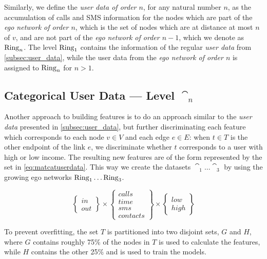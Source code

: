 Similarly, we define the \emph{user data of order $n$}, for any natural number $n$, as the accumulation of calls and SMS information for the nodes which are part of the \emph{ego network of order $n$}, which is the set of nodes which are at distance at most $n$ of $v$, and are not part of the \emph{ego network of order $n - 1$}, which we denote as $\operatorname{Ring}_n$.
The level $\operatorname{Ring}_1$ contains the information of the regular \emph{user data} from \cref{subsec:user_data}, while the user data from the \emph{ego network of order $n$} is assigned to $\operatorname{Ring}_n$ for $n > 1$.

\subsection{Categorical User Data --- Level $\cat_n$}
\label{subsec:categoricaluserdata}

Another approach to building features is to do an approach similar to the \emph{user data} presented in \cref{subsec:user_data}, but further discriminating each feature which corresponds to each node $v \in V$ and each edge $e \in E$:
when $t \in T$ is the other endpoint of the link $e$, we discriminate whether $t$ corresponds to a user with high or low income.
The resulting new features are of the form represented by the set in \cref{eq:matcatuserdata}. This way we create the datasets $\cat_1 \dots \cat_3$ by using the growing ego networks $\operatorname{Ring}_1 \dots \operatorname{Ring}_3$.

\begin{equation}
\begin{Bmatrix} in \\ out \end{Bmatrix}
\times
\begin{Bmatrix} calls \\ time \\ sms \\ contacts \end{Bmatrix}
\times
\begin{Bmatrix} low \\ high \end{Bmatrix}
\label{eq:matcatuserdata}
\end{equation}

To prevent overfitting, the set $T$ is partitioned into two disjoint sets, $G$ and $H$, where $G$ contains roughly 75\% of the nodes in $T$ is used to calculate the features, while $H$ contains the other 25\% and is used to train the models.
